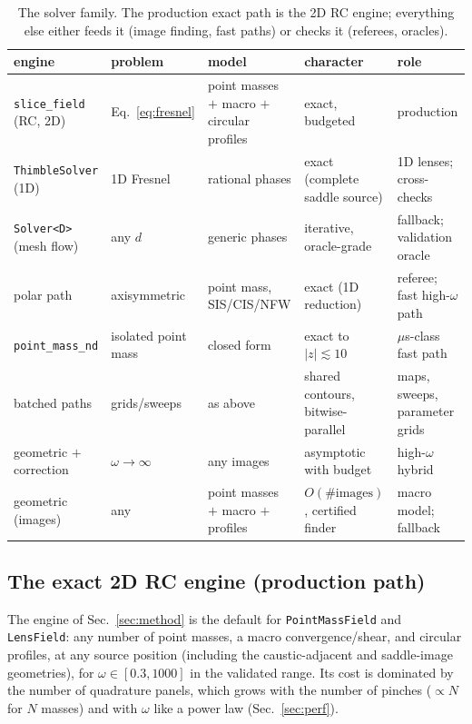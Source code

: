 \documentclass[11pt,a4paper]{article}
\begin{document}
\begin{table}[t]
\centering
\footnotesize
\setlength{\tabcolsep}{4pt}
\begin{tabular}{@{}p{2.35cm}p{2.15cm}p{3.25cm}p{3.35cm}p{3.0cm}@{}}
\toprule
engine & problem & model & character & role\\
\midrule
\texttt{slice\_field} (RC, 2D) & Eq.~\eqref{eq:fresnel} & point masses $+$
  macro $+$ circular profiles & exact, budgeted & production\\
\texttt{ThimbleSolver} (1D) & 1D Fresnel & rational phases & exact
  (complete saddle source) & 1D lenses; cross-checks\\
\texttt{Solver<D>} (mesh flow) & any $d$ & generic phases & iterative,
  oracle-grade & fallback; validation oracle\\
polar path & axisymmetric & point mass, SIS/CIS/NFW & exact (1D reduction)
  & referee; fast high-$\omega$ path\\
\texttt{point\_mass\_nd} & isolated point mass & closed form & exact to
  $|z|\lesssim10$ & $\mu$s-class fast path\\
batched paths & grids/sweeps & as above & shared contours,
  bitwise-parallel & maps, sweeps, parameter grids\\
geometric $+$ correction & $\omega\to\infty$ & any images & asymptotic with
  budget & high-$\omega$ hybrid\\
geometric (images) & any & point masses $+$ macro
  $+$ profiles & $O(\#\text{images})$,
  certified finder & macro model; fallback\\
\bottomrule
\end{tabular}
\caption{The solver family.  The production exact path is the 2D RC engine;
everything else either feeds it (image finding, fast paths) or checks it
(referees, oracles).}
\label{tab:engines}
\end{table}

\subsection{The exact 2D RC engine (production path)}
The engine of Sec.~\ref{sec:method} is the default for
\texttt{PointMassField} and \texttt{LensField}: any number of point masses,
a macro convergence/shear, and circular profiles, at any source position
(including the caustic-adjacent and saddle-image geometries), for
$\omega \in [0.3, 1000]$ in the validated range.  Its cost is dominated by
the number of quadrature panels, which grows with the number of pinches
($\propto N$ for $N$ masses) and with $\omega$ like a power law
(Sec.~\ref{sec:perf}).
\end{document}
